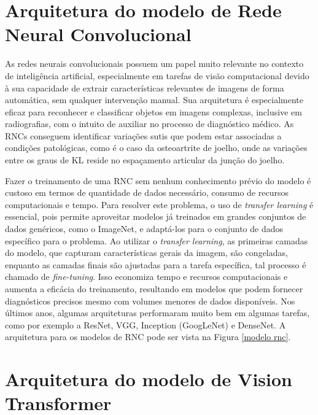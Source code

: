 \section{Arquitetura do modelo de Rede Neural Convolucional}

As redes neurais convolucionais possuem um papel muito relevante no contexto de inteligência artificial, especialmente em tarefas de visão computacional devido à sua capacidade de extrair características relevantes de imagens de forma automática, sem qualquer intervenção manual. Sua arquitetura é especialmente eficaz para reconhecer e classificar objetos em imagens complexas, inclusive em radiografias, com o intuito de auxiliar no processo de diagnóstico médico. As RNCs conseguem identificar variações sutis que podem estar associadas a condições patológicas, como é o caso da osteoartrite de joelho, onde as variações entre os graus de KL reside no espaçamento articular da junção do joelho.

Fazer o treinamento de uma RNC sem nenhum conhecimento prévio do modelo é custoso em termos de quantidade de dados necessário, consumo de recursos computacionais e tempo. Para resolver este problema, o uso de \textit{transfer learning} é essencial, pois permite aproveitar modelos já treinados em grandes conjuntos de dados genéricos, como o ImageNet, e adaptá-los para o conjunto de dados específico para o problema. Ao utilizar o \textit{transfer learning}, as primeiras camadas do modelo, que capturam características gerais da imagem, são congeladas, enquanto as camadas finais são ajustadas para a tarefa específica, tal processo é chamado de \textit{fine-tuning}. Isso economiza tempo e recursos computacionais e aumenta a eficácia do treinamento, resultando em modelos que podem fornecer diagnósticos precisos mesmo com volumes menores de dados disponíveis. Nos últimos anos, algumas arquiteturas performaram muito bem em algumas tarefas, como por exemplo a ResNet, VGG, Inception (GoogLeNet) e DenseNet. A arquitetura para os modelos de RNC pode ser vista na Figura \ref{modelo rnc}.

\section{Arquitetura do modelo de Vision Transformer}

